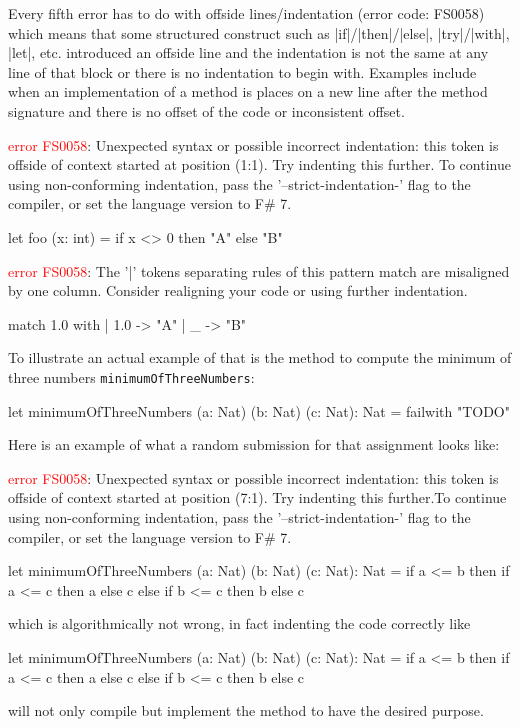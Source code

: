 \pagebreak
Every fifth error has to do with offside lines/indentation (error code: FS0058) which means that some structured construct such as \fsharp|if|/\fsharp|then|/\fsharp|else|, \fsharp|try|/\fsharp|with|, \fsharp|let|, etc.
introduced an offside line and the indentation is not the same at any line of that block or there is no indentation to begin with.
Examples include when an implementation of a method is places on a new line after the method signature and there is no offset of the code or inconsistent offset.

\begin{fsharpcodeshort}{}{\ttfamily\raggedright\footnotesize
    \textcolor{red}{error FS0058}: Unexpected syntax or possible incorrect indentation: this token is offside of context started at position (1:1). Try indenting this further.
    To continue using non-conforming indentation, pass the '--strict-indentation-' flag to the compiler, or set the language version to F\# 7.%
}
let foo (x: int) =
if x <> 0 then "A" else "B"
\end{fsharpcodeshort}

\begin{fsharpcodeshort}{}{\ttfamily\raggedright\footnotesize
    \textcolor{red}{error FS0058}: The '|' tokens separating rules of this pattern match are misaligned by one column. Consider realigning your code or using further indentation.%
}
match 1.0 with
 | 1.0 -> "A"
| _ -> "B"
\end{fsharpcodeshort}
\noindent To illustrate an actual example of that is the method to compute the minimum of three numbers \texttt{minimumOfThreeNumbers}:

\begin{fsharpcodeshort}{}{}
let minimumOfThreeNumbers (a: Nat) (b: Nat) (c: Nat): Nat = 
    failwith "TODO"
\end{fsharpcodeshort}
\noindent Here is an example of what a random submission for that assignment looks like:

\begin{fsharpcodeshortwithspaces}{}{\ttfamily\raggedright\footnotesize
    \textcolor{red}{error FS0058}: Unexpected syntax or possible incorrect indentation: this token is offside of context started at position (7:1). Try indenting this further.To continue using non-conforming indentation, pass the '--strict-indentation-' flag to the compiler, or set the language version to F\# 7.%
}
let minimumOfThreeNumbers (a: Nat) (b: Nat) (c: Nat): Nat = 
if a <= b then
     if a <= c then a else c
else
    if b <= c then b else c
\end{fsharpcodeshortwithspaces}
\noindent which is algorithmically not wrong, in fact indenting the code correctly like
\begin{fsharpcodeshortwithspaces}{}{}
let minimumOfThreeNumbers (a: Nat) (b: Nat) (c: Nat): Nat = 
    if a <= b then
        if a <= c then a else c
    else
        if b <= c then b else c
\end{fsharpcodeshortwithspaces}
\noindent will not only compile but implement the method to have the desired purpose.

